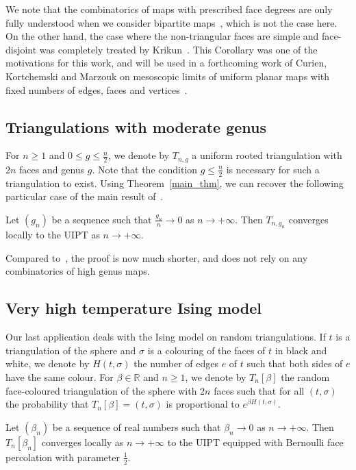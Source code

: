 \documentclass[AHL,Unicode,longabstracts,published]{cedram}
\newcommand{\R}{\mathbb{R}}
\begin{document}
We note that the combinatorics of maps with prescribed face degrees are only fully understood when we consider bipartite maps~\cite{MM07}, which is not the case here. On the other hand, the case where the non-triangular faces are simple and face-disjoint was completely treated by Krikun~\cite{Kri07}. This Corollary was one of the motivations for this work, and will be used in a forthcoming work of Curien, Kortchemski and Marzouk on mesoscopic limits of uniform planar maps with fixed numbers of edges, faces and vertices~\cite{CKM21}.

\subsection*{Triangulations with moderate genus} For $n \geq 1$ and $0 \leq g \leq \frac{n}{2}$, we denote by $T_{n,g}$ a uniform rooted triangulation with $2n$ faces and genus $g$. Note that the condition $g \leq \frac{n}{2}$ is necessary for such a triangulation to exist. Using Theorem~\ref{main_thm}, we can recover the following particular case of the main result of~\cite{BL19}.

\begin{coro}\label{cor_moderate_genus}
Let $(g_n)$ be a sequence such that $\frac{g_n}{n} \to 0$ as $n \to +\infty$. Then $T_{n,g_n}$ converges locally to the UIPT as $n \to +\infty$.
\end{coro}

Compared to~\cite{BL19}, the proof is now much shorter, and does not rely on any combinatorics of high genus maps.

\subsection*{Very high temperature Ising model} Our last application deals with the Ising model on random triangulations. If $t$ is a triangulation of the sphere and $\sigma$ is a colouring of the faces of $t$ in black and white, we denote by $H(t,\sigma)$ the number of edges $e$ of $t$ such that both sides of $e$ have the same colour. For $\beta \in \R$ and $n \geq 1$, we denote by $T_n[\beta]$ the random face-coloured triangulation of the sphere with $2n$ faces such that for all $(t, \sigma)$ the probability that $T_n[\beta]=(t,\sigma)$ is proportional to $e^{\beta H(t,\sigma)}$.

\begin{coro}\label{cor_Ising}
Let $(\beta_n)$ be a sequence of real numbers such that $\beta_n \to 0$ as $n \to +\infty$. Then $T_n[\beta_n]$ converges locally as $n \to +\infty$ to the UIPT equipped with Bernoulli face percolation with parameter $\frac{1}{2}$.
\end{coro}
\end{document}
